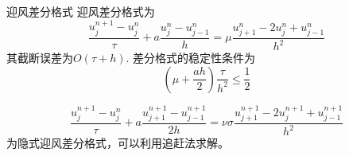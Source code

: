 \documentclass[xcolor=svgnames]{beamer} %
\begin{document}
\begin{frame}{迎风差分格式}
迎风差分格式为
\begin{equation}\label{eq:cf_dkfangc_yf}
 \dfrac{u_j^{n+1}-u_j^n}{\tau}+a\dfrac{u_j^n-u_{j-1}^n}{h}=\mu\dfrac{u_{j+1}^n-2u_j^n+u_{j-1}^{n}}{h^2}
\end{equation}
其截断误差为$O(\tau+h)$.
差分格式的稳定性条件为
\begin{equation}
 \left(\mu+\dfrac{ah}{2}\right)\dfrac{\tau}{h^2}\leq\dfrac{1}{2}
\end{equation}\par
\begin{equation}\label{eq:04_yfcf_ys}
 \dfrac{u_j^{n+1}-u_j^n}{\tau}+a\dfrac{u_{j+1}^{n+1}-u_{j-1}^{n+1}}{2h}=\nu\sigma\dfrac{u_{j+1}^{n+1}
 -2u_j^{n+1}+u_{j-1}^{n+1}}{h^2}
\end{equation}
为隐式迎风差分格式，可以利用追赶法求解。
\end{frame}
\end{document}
